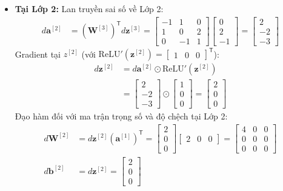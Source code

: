 \begin{itemize}
    \item \textbf{Tại Lớp 2:}
    Lan truyền sai số về Lớp 2:
    \begin{align*}
    d\mathbf{a}^{[2]} &= \left(\mathbf{W}^{[3]}\right)^{\mathsf{T}} d\mathbf{z}^{[3]} = \begin{bmatrix} -1 & 1 & 0 \\ 1 & 0 & 2 \\ 0 & -1 & 1 \end{bmatrix} \begin{bmatrix} 0 \\ 2 \\ -1 \end{bmatrix} = \begin{bmatrix} 2 \\ -2 \\ -3 \end{bmatrix}
    \end{align*}
    Gradient tại $z^{[2]}$ (với $\text{ReLU}'(\mathbf{z}^{[2]}) = \begin{bmatrix} 1 & 0 & 0 \end{bmatrix}^{\mathsf{T}}$):
    \begin{align*}
    d\mathbf{z}^{[2]} &= d\mathbf{a}^{[2]} \odot \text{ReLU}'(\mathbf{z}^{[2]}) \\
    &= \begin{bmatrix} 2 \\ -2 \\ -3 \end{bmatrix} \odot \begin{bmatrix} 1 \\ 0 \\ 0 \end{bmatrix} = \begin{bmatrix} 2 \\ 0 \\ 0 \end{bmatrix}
    \end{align*}
    Đạo hàm đối với ma trận trọng số và độ chệch tại Lớp 2:
    \begin{align*}
    d\mathbf{W}^{[2]} &= d\mathbf{z}^{[2]} \left(\mathbf{a}^{[1]}\right)^{\mathsf{T}} = \begin{bmatrix} 2 \\ 0 \\ 0 \end{bmatrix} \begin{bmatrix} 2 & 0 & 0 \end{bmatrix} = \begin{bmatrix} 4 & 0 & 0 \\ 0 & 0 & 0 \\ 0 & 0 & 0 \end{bmatrix} \\
    d\mathbf{b}^{[2]} &= d\mathbf{z}^{[2]} = \begin{bmatrix} 2 \\ 0 \\ 0 \end{bmatrix}
    \end{align*}


\end{itemize}
